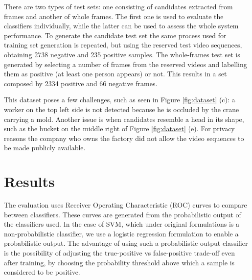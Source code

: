 There are two types of test sets: one consisting of candidates extracted from frames and another of whole frames. The first one is used to evaluate the classifiers individually, while the latter can be used to assess the whole system performance. To generate the candidate test set the same process used for training set generation is repeated, but using the reserved test video sequences, obtaining 2738 negative and 235 positive samples. The whole-frames test set is generated by selecting a number of frames from the reserved videos and labelling them as positive (at least one person appears) or not. This results in a set composed by 2334 positive and 66 negative frames.

This dataset poses a few challenges, such as seen in Figure \ref{fig:dataset} (c): a worker on the top left side is not detected because he is occluded by the crane carrying a mold. Another issue is when candidates resemble a head in its shape, such as the bucket on the middle right of Figure \ref{fig:dataset} (e).  For privacy reasons the company who owns the factory did not allow the video sequences to be made publicly available.

\begin{figure*}[!t]
\centering
{}%
\hfil
{}%

%
\hfil
{}%

%
\hfil
{}%
\caption{Dataset examples. Images in first column are RGB and on the right are corresponding depth images. The bounding boxes in the images are obtained by the candidate detection algorithm.}
\label{fig:dataset}
\end{figure*}


\section{Results}
\label{sec:results}

    The evaluation uses Receiver Operating Characteristic (ROC) curves \cite{evaluationMetrics} to compare between classifiers. These curves are generated from the probabilistic output of the classifiers used. In the case of SVM, which under original formulations is a non-probabilistic classifier, we use a logistic regression formulation \cite{svmProbabilisticOutput} to enable a probabilistic output. The advantage of using such a probabilistic output classifier is the possibility of adjusting the true-positive vs false-positive trade-off even after training, by choosing the probability threshold above which a sample is considered to be positive.

